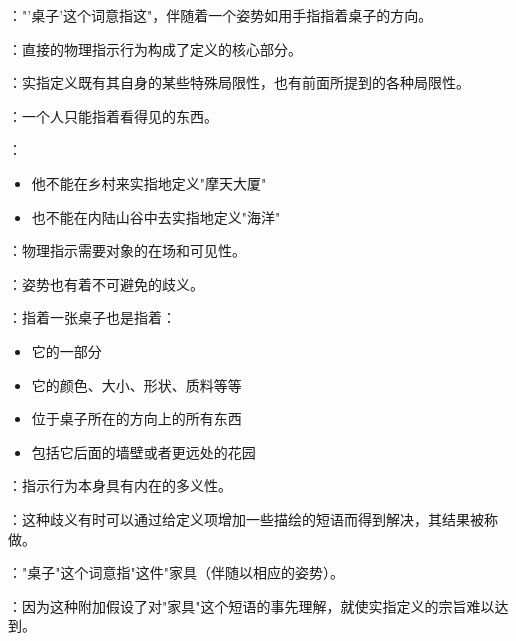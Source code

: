\begin{examplebox}[title=实指定义的典型例子]
："'桌子'这个词意指这"，伴随着一个姿势如用手指指着桌子的方向。

：直接的物理指示行为构成了定义的核心部分。
\end{examplebox}

\begin{theorembox}[title=实指定义的双重局限性]
：实指定义既有其自身的某些特殊局限性，也有前面所提到的各种局限性。
\end{theorembox}

\begin{theorembox}[title=局限一：地域限制]
：一个人只能指着看得见的东西。

：
\begin{itemize}
  \item 他不能在乡村来实指地定义"摩天大厦"
  \item 也不能在内陆山谷中去实指地定义"海洋"
\end{itemize}

：物理指示需要对象的在场和可见性。
\end{theorembox}

\begin{theorembox}[title=局限二：指示歧义]
：姿势也有着不可避免的歧义。

：指着一张桌子也是指着：
\begin{itemize}
  \item 它的一部分
  \item 它的颜色、大小、形状、质料等等
  \item 位于桌子所在的方向上的所有东西
  \item 包括它后面的墙壁或者更远处的花园
\end{itemize}

：指示行为本身具有内在的多义性。
\end{theorembox}

\begin{theorembox}[title=准实指定义的改进尝试]
：这种歧义有时可以通过给定义项增加一些描绘的短语而得到解决，其结果被称做。

："桌子"这个词意指"这件"家具（伴随以相应的姿势）。

：因为这种附加假设了对"家具"这个短语的事先理解，就使实指定义的宗旨难以达到。
\end{theorembox}


